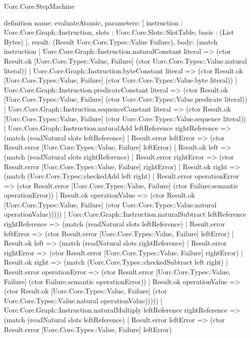 \begin{lexlean}{Uorc.Core.StepMachine}
\begin{semanticmodule}
definition{
  name: evaluateAtomic,
  parameters: [
    instruction : Uorc.Core.Graph::Instruction,
    slots : Uorc.Core.Slots::SlotTable,
    basis : (List Bytes)
  ],
  result: (Result Uorc.Core.Types::Value Failure),
  body: (match instruction
    | Uorc.Core.Graph::Instruction.naturalConstant literal => (ctor Result.ok [Uorc.Core.Types::Value, Failure] (ctor Uorc.Core.Types::Value.natural literal))
    | Uorc.Core.Graph::Instruction.byteConstant literal => (ctor Result.ok [Uorc.Core.Types::Value, Failure] (ctor Uorc.Core.Types::Value.byte literal))
    | Uorc.Core.Graph::Instruction.predicateConstant literal => (ctor Result.ok [Uorc.Core.Types::Value, Failure] (ctor Uorc.Core.Types::Value.predicate literal))
    | Uorc.Core.Graph::Instruction.sequenceConstant literal => (ctor Result.ok [Uorc.Core.Types::Value, Failure] (ctor Uorc.Core.Types::Value.sequence literal))
    | Uorc.Core.Graph::Instruction.naturalAdd leftReference rightReference => (match (readNatural slots leftReference)
      | Result.error leftError => (ctor Result.error [Uorc.Core.Types::Value, Failure] leftError)
      | Result.ok left => (match (readNatural slots rightReference)
        | Result.error rightError => (ctor Result.error [Uorc.Core.Types::Value, Failure] rightError)
        | Result.ok right => (match (Uorc.Core.Types::checkedAdd left right)
          | Result.error operationError => (ctor Result.error [Uorc.Core.Types::Value, Failure] (ctor Failure.semantic operationError))
          | Result.ok operationValue => (ctor Result.ok [Uorc.Core.Types::Value, Failure] (ctor Uorc.Core.Types::Value.natural operationValue)))))
    | Uorc.Core.Graph::Instruction.naturalSubtract leftReference rightReference => (match (readNatural slots leftReference)
      | Result.error leftError => (ctor Result.error [Uorc.Core.Types::Value, Failure] leftError)
      | Result.ok left => (match (readNatural slots rightReference)
        | Result.error rightError => (ctor Result.error [Uorc.Core.Types::Value, Failure] rightError)
        | Result.ok right => (match (Uorc.Core.Types::checkedSubtract left right)
          | Result.error operationError => (ctor Result.error [Uorc.Core.Types::Value, Failure] (ctor Failure.semantic operationError))
          | Result.ok operationValue => (ctor Result.ok [Uorc.Core.Types::Value, Failure] (ctor Uorc.Core.Types::Value.natural operationValue)))))
    | Uorc.Core.Graph::Instruction.naturalMultiply leftReference rightReference => (match (readNatural slots leftReference)
      | Result.error leftError => (ctor Result.error [Uorc.Core.Types::Value, Failure] leftError)
}
\end{semanticmodule}
\end{lexlean}
